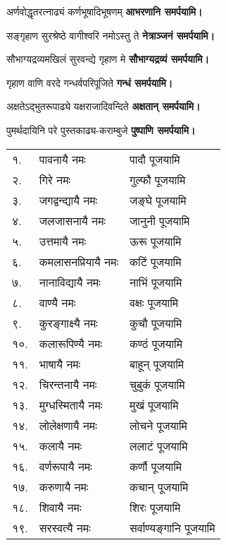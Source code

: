 \begin{center}
{अर्णवोद्धृतरत्नाढ्यं कर्णभूषादिभूषणम्}
\textbf{\devAya{} आभरणानि समर्पयामि।}
\medskip


{सङ्गृहाण सुरश्रेष्ठे वागीश्वरि नमोऽस्तु ते}
\textbf{\devAya{} नेत्राञ्जनं समर्पयामि।}
\medskip

{सौभाग्यद्रव्यमखिलं सुरवन्द्ये गृहाण मे}
\textbf{\devAya{} सौभाग्यद्रव्यं समर्पयामि।}
\medskip

{गृहाण वाणि वरदे गन्धर्वपरिपूजिते}
\textbf{\devAya{} गन्धं समर्पयामि।}
\medskip

{अक्षतेऽद्भुतरूपाढ्ये यक्षराजादिवन्दिते}
\textbf{\devAya{} अक्षतान् समर्पयामि।}
\medskip

{पुमर्थदायिनि परे पुस्तकाढ्य-कराम्बुजे}
\textbf{\devAya{} पुष्पाणि समर्पयामि।}
\end{center}


\begin{longtable}{ll@{— }l}
 १. & पावनायै नमः & पादौ पूजयामि\\
 २. & गिरे नमः & गुल्फौ पूजयामि\\
 ३. & जगद्वन्द्यायै नमः &  जङ्घे पूजयामि\\
 ४. & जलजासनायै नमः & जानुनी पूजयामि\\
 ५. & उत्तमायै नमः & ऊरू  पूजयामि\\
 ६. & कमलासनप्रियायै नमः & कटिं पूजयामि\\
 ७. & नानाविद्यायै नमः & नाभिं पूजयामि\\
 ८. & वाण्यै नमः & वक्षः पूजयामि\\
 ९. & कुरङ्गाक्ष्यै नमः & कुचौ पूजयामि\\
१०. & कलारूपिण्यै नमः &  कण्ठं पूजयामि\\
११. & भाषायै नमः & बाहून् पूजयामि\\
१२. & चिरन्तनायै नमः & चुबुकं पूजयामि\\
१३. & मुग्धस्मितायै नमः & मुखं पूजयामि\\
१४. & लोलेक्षणायै नमः & लोचने पूजयामि\\
१५. & कलायै नमः & ललाटं पूजयामि\\
१६. & वर्णरूपायै नमः & कर्णौ पूजयामि\\
१७. & करुणायै नमः & कचान् पूजयामि\\
१८. & शिवायै नमः & शिरः पूजयामि\\
१९. & सरस्वत्यै नमः &  सर्वाण्यङ्गानि पूजयामि\\
\end{longtable}

